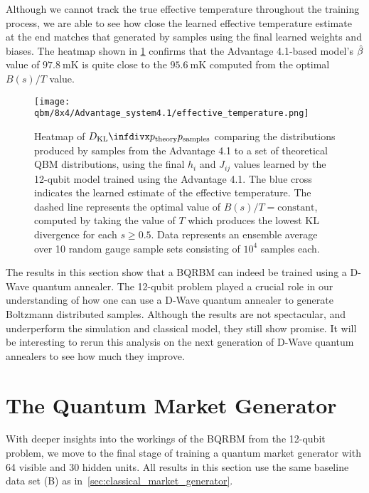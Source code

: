 Although we cannot track the true effective temperature throughout the training process, we are able to see how close the learned effective temperature estimate at the end matches that generated by samples using the final learned weights and biases.
The heatmap shown in \cref{fig:learned_effective_temperature} confirms that the Advantage 4.1-based model's \( \hat{\beta} \) value of \( 97.8 \ \si{\milli\kelvin} \) is quite close to the \( 95.6 \ \si{\milli\kelvin} \) computed from the optimal \( B(s) / T \) value.
\begin{figure}[!htb]
    \begin{center}
        \texttt{[image: qbm/8x4/Advantage\_system4.1/effective\_temperature.png]}
    \end{center}
    \caption{
        Heatmap of \( \DKL{\ptheory}{\psamples} \) comparing the distributions produced by samples from the Advantage 4.1 to a set of theoretical QBM distributions, using the final \( h_i \) and \( J_{ij} \) values learned by the 12-qubit model trained using the Advantage 4.1.
        The blue cross indicates the learned estimate of the effective temperature.
        The dashed line represents the optimal value of \( B(s) / T = \text{constant} \), computed by taking the value of \( T \) which produces the lowest KL divergence for each \( s \ge 0.5 \).
        Data represents an ensemble average over 10 random gauge sample sets consisting of \( 10^4 \) samples each.
    }
    \label{fig:learned_effective_temperature}
\end{figure}

The results in this section show that a BQRBM can indeed be trained using a D-Wave quantum annealer.
The 12-qubit problem played a crucial role in our understanding of how one can use a D-Wave quantum annealer to generate Boltzmann distributed samples.
Although the results are not spectacular, and underperform the simulation and classical model, they still show promise.
It will be interesting to rerun this analysis on the next generation of D-Wave quantum annealers to see how much they improve.

\section{The Quantum Market Generator}\label{sec:quantum_market_generator}
With deeper insights into the workings of the BQRBM from the 12-qubit problem, we move to the final stage of training a quantum market generator with 64 visible and 30 hidden units.
All results in this section use the same baseline data set (B) as in~\cref{sec:classical_market_generator}.

